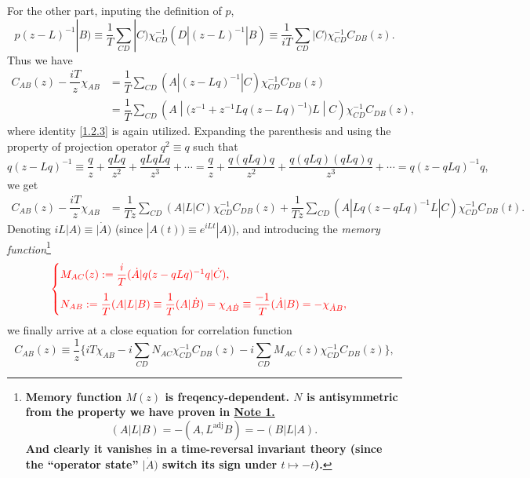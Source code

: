 \documentclass[10pt,nofootinbib,letterpaper]{revtex4}
\newcounter{Note}[section]
\begin{document}
			For the other part, inputing the definition of $p$, 
			\begin{equation*}
				p(z-L)^{-1}|B)\equiv\dfrac{1}{T}\sum_{CD}|C)\chi_{CD}^{-1}(D|(z-L)^{-1}|B)\equiv\dfrac{1}{iT}\sum_{CD}|C)\chi_{CD}^{-1} C_{DB}(z).
			\end{equation*}
			Thus we have
			\begin{align*}
				C_{AB}(z)-\dfrac{iT}{z}\chi_{AB}&=\dfrac{1}{T}\sum_{CD} (A|(z-Lq)^{-1}|C)\chi_{CD}^{-1}C_{DB}(z)\\
				&=\dfrac{1}{T}\sum_{CD} \left(A\middle|\bigg(z^{-1}+z^{-1}Lq(z-Lq)^{-1}\bigg)L\middle|C\right)\chi_{CD}^{-1}C_{DB}(z), 
			\end{align*}
			where identity \eqref{1.2.3} is again utilized. Expanding the parenthesis and using the property of projection operator $q^2\equiv q$ such that
			\begin{equation*}
				q(z-Lq)^{-1}\equiv\dfrac{q}{z}+\dfrac{qLq}{z^2}+\dfrac{qLqLq}{z^3}+\cdots=\dfrac{q}{z}+\dfrac{q(qLq)q}{z^2}+\dfrac{q(qLq)(qLq)q}{z^3}+\cdots=q(z-qLq)^{-1}q,
			\end{equation*}
			we get
			\begin{align*}
				C_{AB}(z)-\dfrac{iT}{z}\chi_{AB}&=\dfrac{1}{Tz}\sum_{CD}(A|L|C)\chi_{CD}^{-1}C_{DB}(z)+\dfrac{1}{Tz}\sum_{CD}(A|Lq(z-qLq)^{-1}L|C)\chi_{CD}^{-1}C_{DB}(t).
			\end{align*}
			Denoting $iL|A)\equiv|\dot{A})$ (since $|A(t))\equiv e^{iLt}|A)$), and introducing the \emph{memory function}\footnote{\textbf{Memory function $M(z)$ is freqency-dependent. $N$ is antisymmetric from the property we have proven in \underline{\bfseries{Note 1.}} 
			\begin{equation*}
				(A|L|B)=-(A,L^{\mathrm{adj}}B)=-(B|L|A).
			\end{equation*}
			And clearly it vanishes in a time-reversal invariant theory (since the ``operator state'' $|\dot{A})$ switch its sign under $t\mapsto-t$).}}
			\begin{equation}\label{1.2.4}
				{\color{red}
				\begin{cases}
					M_{AC}(z):=\dfrac{i}{T}(\dot{A}|q(z-qLq)^{-1}q|\dot{C}),\\[1em]
					N_{AB}:=\dfrac{1}{T}(A|L|B)\equiv\dfrac{1}{T}(A|\dot{B})=\chi_{A\dot{B}}\equiv\dfrac{-1}{T}(\dot{A}|B)=-\chi_{\dot{A}B},
				\end{cases}}
			\end{equation}
			we finally arrive at a close equation for correlation function
			\begin{equation*}
				C_{AB}(z)\equiv\dfrac{1}{z}\bigg\{iT\chi_{AB}-i\sum_{CD}N_{AC}\chi_{CD}^{-1}C_{DB}(z)-i\sum_{CD}M_{AC}(z)\chi_{CD}^{-1}C_{DB}(z)\bigg\},
			\end{equation*}
\end{document}
